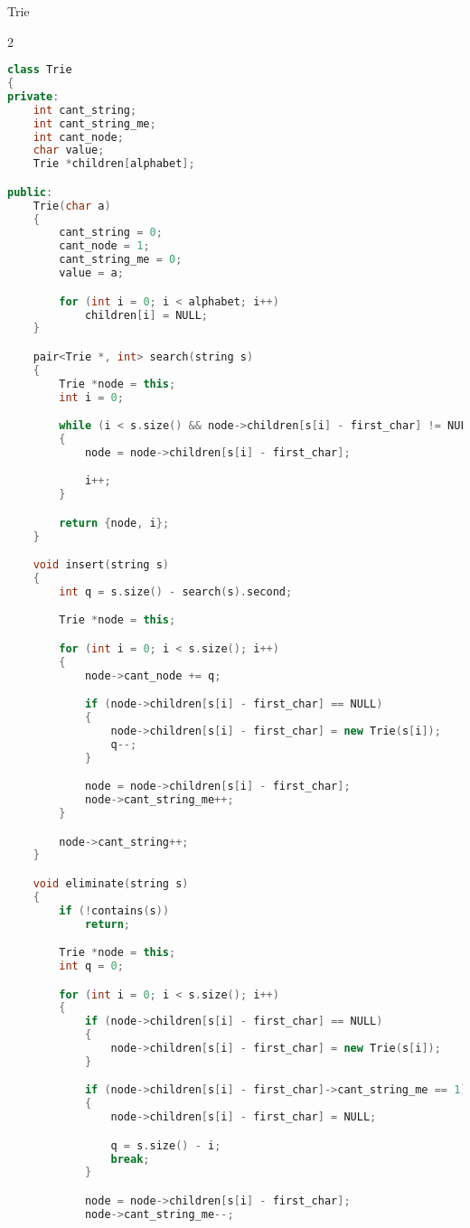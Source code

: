 \documentclass[leter]{amsart}
\begin{document}
Trie
\begin{multicols}{2}
\begin{lstlisting}[language=C++]
class Trie
{
private:
    int cant_string;
    int cant_string_me;
    int cant_node;
    char value;
    Trie *children[alphabet];

public:
    Trie(char a)
    {
        cant_string = 0;
        cant_node = 1;
        cant_string_me = 0;
        value = a;

        for (int i = 0; i < alphabet; i++)
            children[i] = NULL;
    }

    pair<Trie *, int> search(string s)
    {
        Trie *node = this;
        int i = 0;

        while (i < s.size() && node->children[s[i] - first_char] != NULL)
        {
            node = node->children[s[i] - first_char];

            i++;
        }

        return {node, i};
    }

    void insert(string s)
    {
        int q = s.size() - search(s).second;

        Trie *node = this;

        for (int i = 0; i < s.size(); i++)
        {
            node->cant_node += q;

            if (node->children[s[i] - first_char] == NULL)
            {
                node->children[s[i] - first_char] = new Trie(s[i]);
                q--;
            }

            node = node->children[s[i] - first_char];
            node->cant_string_me++;
        }

        node->cant_string++;
    }

    void eliminate(string s)
    {
        if (!contains(s))
            return;

        Trie *node = this;
        int q = 0;

        for (int i = 0; i < s.size(); i++)
        {
            if (node->children[s[i] - first_char] == NULL)
            {
                node->children[s[i] - first_char] = new Trie(s[i]);
            }

            if (node->children[s[i] - first_char]->cant_string_me == 1)
            {
                node->children[s[i] - first_char] = NULL;

                q = s.size() - i;
                break;
            }

            node = node->children[s[i] - first_char];
            node->cant_string_me--;


\end{lstlisting}
\end{multicols}
\end{document}

